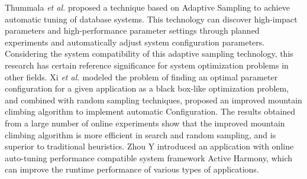 \documentclass[twoside]{article}
\begin{document}
\begin{multicols}{2}
Thummala {\it et al.} proposed a technique based on Adaptive Sampling to achieve automatic tuning of database systems\cite{wwy39,wwy40}. This technology can discover high-impact parameters and high-performance parameter settings through planned experiments and automatically adjust system configuration parameters. 
Considering the system compatibility of this adaptive sampling technology, this research has certain reference significance for system optimization problems in other fields. 
Xi {\it et al.} modeled the problem of finding an optimal parameter configuration for a given application as a black box-like optimization problem, and combined with random sampling techniques, proposed an improved mountain climbing algorithm to implement automatic Configuration\cite{wwy41}. 
The results obtained from a large number of online experiments show that the improved mountain climbing algorithm is more efficient in search and random sampling, and is superior to traditional heuristics. 
Zhou Y introduced an application with online auto-tuning performance compatible system framework Active Harmony, which can improve the runtime performance of various types of applications\cite{wwy42}. 


\end{multicols}
\end{document}
